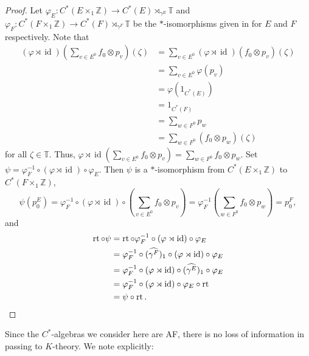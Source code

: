 \documentclass[12pt]{amsbook}%
\newcommand{\lt}{\operatorname{rt}}
\renewcommand{\phi}{\varphi}
\theoremstyle{defin}
\theoremstyle{remark}
\numberwithin{equation}{chapter}
\numberwithin{theor}{section}
\newcommand{\TT}{\mathbb{T}}
\newcommand{\ZZ}{\mathbb{Z}}
\newcommand{\id}{\operatorname{id}}
\begin{document}
\begin{proof}
Let $\phi_E \colon C^*(E \times_1 \ZZ ) \to C^*(E)\rtimes_{\gamma^E} \TT$ and $\phi_F \colon C^*(F \times_1\ZZ) \to C^*(F) \rtimes_{\gamma^F} \TT$ be the $*$-isomorphisms given in \cite[Lemma~3.1]{irws:ckigm} for $E$ and $F$ respectively.  Note that 
\begin{align*}
(\phi \rtimes \id) \left( \sum_{v \in E^0 } f_0 \otimes p_v \right)(\zeta) &= \sum_{ v \in E^0 }  ( \phi \rtimes \id )( f_0 \otimes p_v )( \zeta ) \\
									&= \sum_{ v \in E^0 } \phi ( p_v ) \\\
									&= \phi ( 1_{C^*(E) } ) \\\
									&= 1_{C^*(F)} \\
									&= \sum_{w \in F^0 } p_w \\
									&= \sum_{ w \in F^0 } ( f_0 \otimes p_w )(\zeta)
\end{align*}
for all $\zeta \in \TT$.  Thus, $\phi \rtimes \id \left( \sum_{v \in E^0 } f_0 \otimes p_v \right) = \sum_{ w \in F^0 } f_0 \otimes p_w $.  Set $\psi = \phi_F^{-1} \circ (\phi \rtimes \id ) \circ \phi_E$.  Then $\psi$ is a $*$-isomorphism from $C^*(E\times_1\ZZ)$ to $C^*(F\times_1\ZZ)$, 
\[
\psi \left( p^E_0 \right) =  \phi_F^{-1} \circ ( \phi \rtimes \id ) \circ \left( \sum_{v \in E^0 } f_0 \otimes p_v  \right)  = \phi_F^{-1} \left( \sum_{w \in F^0 }  f_0 \otimes p_w \right) = p^F_0,
\]
and 
\begin{align*}
\lt \circ \psi &= \lt \circ \phi_F^{-1} \circ (\phi \rtimes \id ) \circ \phi_E  \\
			&= \phi_F^{-1} \circ ( \widehat{\gamma^F})_1 \circ (\phi \rtimes \id ) \circ \phi_E   \\
			&= \phi_F^{-1} \circ ( \phi \rtimes \id ) \circ (\widehat{\gamma^E})_1 \circ \phi_E \\
			&= \phi_F^{-1} \circ ( \phi \rtimes \id ) \circ  \phi_E \circ \lt \\
			&= \psi \circ \lt.\qedhere
\end{align*}
\end{proof}

Since the $C^*$-algebras we consider here are AF, there is no loss of information in passing to $K$-theory. We note explicitly:
\end{document}
